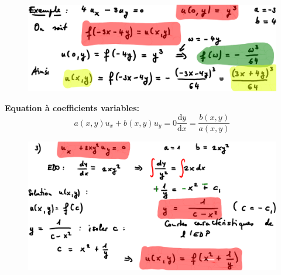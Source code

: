 \begin{figure}[H]
    \centering
    \includegraphics[width=\linewidth]{images/semaine1_equ_coeff_const.png}
\end{figure}
\textbf{Equation à coefficients variables:}
\begin{subequations}
    \begin{equation*}
        a(x,y)u_x+b(x,y)u_y=0
    \end{equation*}
    \begin{equation*}
        \boxed{\frac{\mathrm{d} y}{\mathrm{d} x}=\frac{b(x,y)}{a(x,y)}}
    \end{equation*}
\end{subequations}
\begin{figure}[H]
    \centering
    \includegraphics[width=\linewidth]{images/semaine1_equ_coeff_var1.png}
\end{figure}



